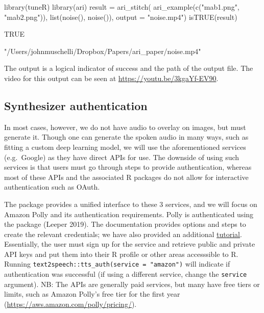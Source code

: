 \begin{Schunk}
\begin{Sinput}
library(tuneR)
library(ari)
result = ari_stitch(
  ari_example(c("mab1.png", "mab2.png")),
  list(noise(), noise()),
  output = "noise.mp4")
isTRUE(result)
\end{Sinput}
\begin{Soutput}
[1] TRUE
\end{Soutput}
\begin{Soutput}
[1] "/Users/johnmuschelli/Dropbox/Papers/ari_paper/noise.mp4"
\end{Soutput}
\end{Schunk}

The output is a logical indicator of success and the path of the output
file. The video for this output can be seen at
\url{https://youtu.be/3kgaYf-EV90}.

\hypertarget{synthesizer-authentication}{%
\subsection{Synthesizer
authentication}\label{synthesizer-authentication}}

In most cases, however, we do not have audio to overlay on images, but
must generate it. Though one can generate the spoken audio in many ways,
such as fitting a custom deep learning model, we will use the
aforementioned services (e.g.~Google) as they have direct APIs for use.
The downside of using such services is that users must go through steps
to provide authentication, whereas most of these APIs and the associated
R packages do not allow for interactive authentication such as OAuth.

The  package provides a unified interface to these 3
services, and we will focus on Amazon Polly and its authentication
requirements. Polly is authenticated using the 
package (Leeper 2019). The  documentation provides
options and steps to create the relevant credentials; we have also
provided an additional
\href{http://seankross.com/2017/05/02/Access-Amazon-Web-Services-in-R.html}{tutorial}.
Essentially, the user must sign up for the service and retrieve public
and private API keys and put them into their R profile or other areas
accesssible to R. Running
\texttt{text2speech::tts\_auth(service\ =\ "amazon")} will indicate if
authentication was successful (if using a different service, change the
\texttt{service} argument). NB: The APIs are generally paid services,
but many have free tiers or limits, such as Amazon Polly's free tier for
the first year (\url{https://aws.amazon.com/polly/pricing/}).

